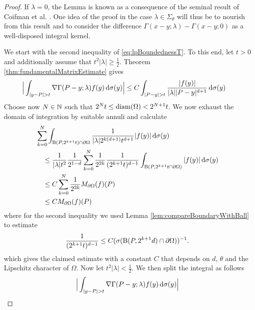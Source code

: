 \begin{proof}
  If $\lambda = 0$, the Lemma is known \cite{fabesKenigVerchota} as a consequence of the seminal result of Coifman et al. \cite{coifmanEtAl}.
  One idea of the proof in the case $\lambda \in \Sigma_\theta$ will thus be to nourish from this result and to consider the difference $\Gamma(x - y; \lambda) - \Gamma(x - y; 0)$ as a well-disposed integral kernel.

  We start with the second inequality of \ref{eq:lpBoundednessT}.
  To this end, let $t > 0$ and additionally assume that $t^2 |\lambda| \geq \frac{1}{2}$. 
  Theorem \ref{thm:fundamentalMatrixEstimate} gives
  \begin{align*}
    \Big| \int_{|y - P| > t} \nabla \Gamma(P - y; \lambda) f(y) \, {\operatorname{d}\!{\sigma}}(y) \Big|
    &\leq C \int_{|P - y| > t} \frac{|f(y)|}{|\lambda| |P - y|^{d + 1}} \, {\operatorname{d}\!{\sigma}}(y) 
  \end{align*}
  Choose now $N \in \mathbb{N}$ such that $2^N t \leq \operatorname{diam}(\Omega) < 2^{N + 1} t$.
  We now exhaust the domain of integration by suitable annuli and calculate
  \begin{align*}
    &\sum_{k = 0}^N \int_{\mathrm{B}(P, 2^{k + 1}t) \cap \partial\Omega} \frac{1}{|\lambda| 2^{k(d + 1)} t^{d + 1}} |f(y)| \, {\operatorname{d}\!{\sigma}}(y) \\
    &\quad\leq \frac{1}{|\lambda|t^2}\frac{1}{2^{1 -d}}\sum_{k = 0}^N \frac{1}{2^{2k}} \frac{1}{(2^{k+1} t)^{d - 1}} \int_{\mathrm{B}(P, 2^{k + 1}t \cap \partial \Omega)}  |f(y)| \, {\operatorname{d}\!{\sigma}}(y) \\
    &\quad\leq C \sum_{k = 0}^N \frac{1}{2^{2k}} M_{\partial\Omega}(f)(P) \\
    &\quad\leq C  M_{\partial\Omega}(f)(P)
  \end{align*}
  where for the second inequality we used Lemma \ref{lem:compareBoundaryWithBall} to estimate
  \begin{align*}
    \frac{1}{(2^{k+1} t)^{d-1}} \leq C (\sigma(\mathrm{B}(P, 2^{k + 1}d) \cap \partial\Omega))^{-1}.
  \end{align*}
  which gives the claimed estimate with a constant $C$ that depends on $d$, $\theta$ and the Lipschitz character of $\Omega$.
  Now let $t^2 |\lambda| < \frac{1}{2}$.
  We then split the integral as follows
  \begin{align*}
    &\Big| \int_{|y - P| > t} \nabla \Gamma(P - y; \lambda) f(y) \d\sigma(y) \Big| \\

\end{align*}
\end{proof}
